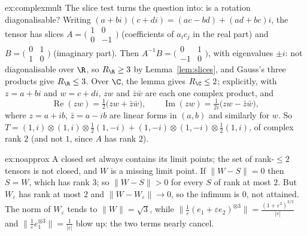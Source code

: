 \begin{solution}{ex:complexmult}
\idea The slice test turns the question into: is a rotation diagonalisable?
\writeup Writing $(a+bi)(c+di)=(ac-bd)+(ad+bc)i$, the tensor has slices $A=\bigl(\begin{smallmatrix}1&0\\0&-1\end{smallmatrix}\bigr)$
(coefficients of $a_ic_j$ in the real part) and $B=\bigl(\begin{smallmatrix}0&1\\1&0\end{smallmatrix}\bigr)$ (imaginary part). Then
$A^{-1}B=\bigl(\begin{smallmatrix}0&1\\-1&0\end{smallmatrix}\bigr)$, with eigenvalues $\pm i$: not diagonalisable over $\R$, so $R_\R\ge3$
by Lemma~\ref{lem:slices}, and Gauss's three products give $R_\R\le3$. Over $\C$, the lemma gives $R_\C\le2$; explicitly, with $z=a+bi$
and $w=c+di$, $zw$ and $\bar z\bar w$ are each one complex product, and
\[
\operatorname{Re}(zw)=\tfrac12\bigl(zw+\bar z\bar w\bigr),\qquad\operatorname{Im}(zw)=\tfrac1{2i}\bigl(zw-\bar z\bar w\bigr),
\]
where $z=a+ib$, $\bar z=a-ib$ are linear forms in $(a,b)$ and similarly for $w$. So $T=(1,i)\otimes(1,i)\otimes\frac12(1,-i)+(1,-i)\otimes
(1,-i)\otimes\frac12(1,i)$, of complex rank $2$ (and not $1$, since $A$ has rank $2$).
\end{solution}

\begin{solution}{ex:noapprox}
\idea A closed set always contains its limit points; the set of rank-$\le2$ tensors is not closed, and $W$ is a missing limit point.
\writeup If $\|W-S\|=0$ then $S=W$, which has rank $3$; so $\|W-S\|>0$ for every $S$ of rank at most $2$. But $W_\varepsilon$ has rank at
most $2$ and $\|W-W_\varepsilon\|\to0$, so the infimum is $0$, not attained. The norm of $W_\varepsilon$ tends to $\|W\|=\sqrt3$, while
$\|\frac1\varepsilon(e_1+\varepsilon e_2)^{\otimes3}\|=\frac{(1+\varepsilon^2)^{3/2}}{|\varepsilon|}$ and $\|\frac1\varepsilon e_1^{\otimes3}\|=\frac1
{|\varepsilon|}$ blow up: the two terms nearly cancel.
\end{solution}

